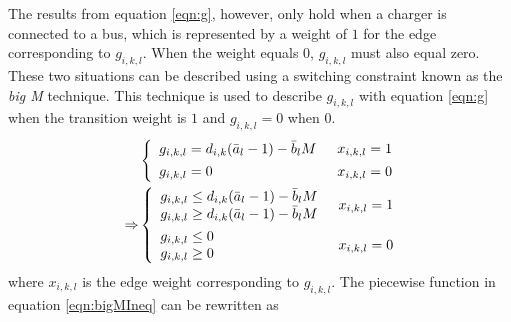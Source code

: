 The results from equation \ref{eqn:g}, however, only hold when a charger is connected to a bus, which is represented by a weight of $1$ for the edge corresponding to $g_{i,k,l}$. When the weight equals $0$, $g_{i,k,l}$ must also equal zero. These two situations can be described using a switching constraint known as the \textit{big M} technique. This technique is used to describe $g_{i,k,l}$ with equation \ref{eqn:g} when the transition weight is $1$ and $g_{i,k,l} = 0$ when $0$.
\begin{equation}\label{eqn:bigMIneq}
\begin{aligned}
	& \begin{dcases} 
		\begin{array}{l}
		g_{i,k,l} = d_{i,k}(\bar{a}_l - 1) - \bar{b}_lM
		\end{array} & x_{i,k,l} = 1\\
		\begin{array}{l}
		g_{i,k,l} = 0
		\end{array} & x_{i,k,l} = 0\\
	\end{dcases} \\ 
	\Rightarrow & 
	\begin{dcases} 
		\begin{array}{l}
		g_{i,k,l} \le d_{i,k}(\bar{a}_l - 1) - \bar{b}_lM\\
		g_{i,k,l} \ge d_{i,k}(\bar{a}_l - 1) - \bar{b}_lM\\
		\end{array}
		& x_{i,k,l} = 1 \\
		\begin{array}{l}
		g_{i,k,l} \le 0 \\
		g_{i,k,l} \ge 0 \\
		\end{array} & x_{i,k,l} = 0\\
    	\end{dcases} 
\end{aligned}
\end{equation}
where $x_{i,k,l}$ is the edge weight corresponding to $g_{i,k,l}$.  The piecewise function in equation \ref{eqn:bigMIneq} can be rewritten as 
